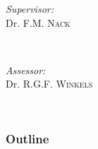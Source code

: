 \documentclass{beamer}
\begin{document}
\begin{frame}
		\begin{minipage}[t]{0.4\textwidth}
		\begin{flushleft} \large
		\emph{Supervisor:} \\
		Dr. F.M. \textsc{Nack}%
		\end{flushleft}
		\end{minipage}
		~
		\begin{minipage}[t]{0.4\textwidth}
		\begin{flushright} \large
		\emph{Assessor:} \\
		Dr. R.G.F. \textsc{Winkels}\\
		\end{flushright}
		\end{minipage}\\[2cm]


		

		\vfill %
	\end{frame}
  
  \begin{frame}
    \frametitle{Outline}
    \tableofcontents
  \end{frame}







\end{document}
